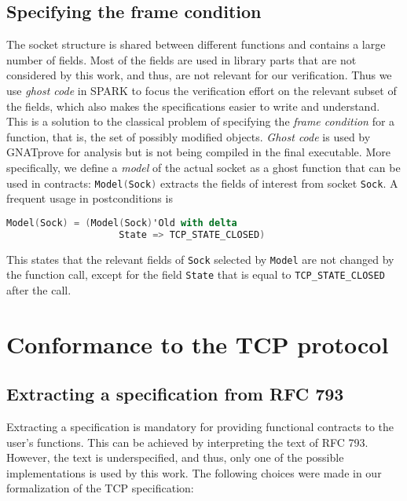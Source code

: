 \documentclass[conference]{IEEEtran}
\def\spark#1{\lstinline[language=Ada]{#1}}
\begin{document}
\subsection{Specifying the frame condition}

The socket structure is shared between different functions and contains a large number of fields. Most of the fields are used in library parts that are not considered by this work, and thus, are not relevant for our verification. Thus we use \emph{ghost code} in SPARK to focus the verification effort on the relevant subset of the fields, which also makes the specifications easier to write and understand. This is a solution to the classical problem of specifying the \emph{frame condition} for a function, that is, the set of possibly modified objects. \emph{Ghost code} is used by GNATprove for analysis but is not being compiled in the final executable. More specifically, we define a \emph{model} of the actual socket as a ghost function that can be used in contracts: \spark{Model(Sock)} extracts the fields of interest from socket \spark{Sock}. A frequent usage in postconditions is

\begin{lstlisting}[language=Ada, basicstyle=\small\ttfamily]
Model(Sock) = (Model(Sock)'Old with delta
                    State => TCP_STATE_CLOSED)
\end{lstlisting}

This states that the relevant fields of \spark{Sock} selected by \spark{Model} are not changed by the function call, except for the field \spark{State} that is equal to \spark{TCP_STATE_CLOSED} after the call.

\section{Conformance to the TCP protocol}
\label{sec:verif}



\subsection{Extracting a specification from RFC 793}

Extracting a specification is mandatory for providing functional contracts to the user's functions. This can be achieved by interpreting the text of RFC 793. However, the text is underspecified, and thus, only one of the possible implementations is used by this work. The following choices were made in our formalization of the TCP specification:
\end{document}
